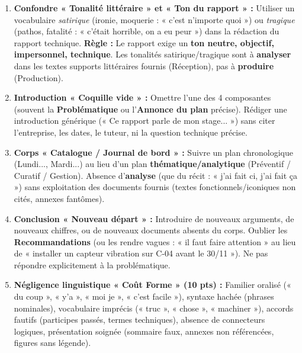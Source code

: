 \documentclass[11pt]{article}
\begin{document}
\begin{attention}
    \begin{enumerate}
        \item \textbf{Confondre « Tonalité littéraire » et « Ton du rapport » :} Utiliser un vocabulaire \emph{satirique} (ironie, moquerie : « c'est n'importe quoi ») ou \emph{tragique} (pathos, fatalité : « c'était horrible, on a eu peur ») dans la rédaction du rapport technique. \textbf{Règle :} Le rapport exige un \textbf{ton neutre, objectif, impersonnel, technique}. Les tonalités satirique/tragique sont à \textbf{analyser} dans les textes supports littéraires fournis (Réception), pas à \textbf{produire} (Production).
        \item \textbf{Introduction « Coquille vide » :} Omettre l'une des 4 composantes (souvent la \textbf{Problématique} ou l'\textbf{Annonce du plan} précise). Rédiger une introduction générique (« Ce rapport parle de mon stage... ») sans citer l'entreprise, les dates, le tuteur, ni la question technique précise.
        \item \textbf{Corps « Catalogue / Journal de bord » :} Suivre un plan chronologique (Lundi..., Mardi...) au lieu d'un plan \textbf{thématique/analytique} (Préventif / Curatif / Gestion). Absence d'\textbf{analyse} (que du récit : « j'ai fait ci, j'ai fait ça ») sans exploitation des documents fournis (textes fonctionnels/iconiques non cités, annexes fantômes).
        \item \textbf{Conclusion « Nouveau départ » :} Introduire de nouveaux arguments, de nouveaux chiffres, ou de nouveaux documents absents du corps. Oublier les \textbf{Recommandations} (ou les rendre vagues : « il faut faire attention » au lieu de « installer un capteur vibration sur C-04 avant le 30/11 »). Ne pas répondre explicitement à la problématique.
        \item \textbf{Négligence linguistique « Coût Forme » (10 pts) :} Familier oralisé (« du coup », « y'a », « moi je », « c'est facile »), syntaxe hachée (phrases nominales), vocabulaire imprécis (« truc », « chose », « machiner »), accords fautifs (participes passés, termes techniques), absence de connecteurs logiques, présentation soignée (sommaire faux, annexes non référencées, figures sans légende).
    \end{enumerate}
\end{attention}

\newpage
\end{document}
